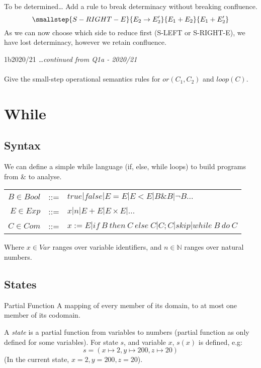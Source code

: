 \begin{examplebox}{To be determined\dots}
    Add a rule to break determinacy without breaking confluence.
    \tcblower
    \[\smallstep{S-RIGHT-E}{E_2 \to E_2'}{E_1 + E_2}{E_1 + E_2'}\]
    As we can now choose which side to reduce first (S-LEFT or S-RIGHT-E), we have lost determinacy, however we retain confluence.
\end{examplebox}

\begin{exambox}{1b}{2020/21}
	\textit{\dots continued from Q1a - 2020/21}
	\\
	\\ Give the small-step operational semantics rules for $or(C_1, C_2)$ and $loop(C)$.
\end{exambox}

\section{While}
\subsection{Syntax}
We can define a simple while language (if, else, while loops) to build programs from \& to analyse.
\begin{center}
	\begin{tabular}{r c l}
		$B \in Bool$ & ::= & $true | false | E = E | E < E | B \& B | \neg B \dots$                   \\
		$E \in Exp$  & ::= & $x | n | E + E | E \times E | \dots$                                     \\
		$C \in Com$  & ::= & $x :=E | if \ B \ then \ C \ else \ C | C;C | skip | while \ B \ do \ C$ \\
	\end{tabular}
\end{center}
Where $x \in Var$ ranges over variable identifiers, and $n \in \mathbb{N}$ ranges over natural numbers.

\subsection{States}
\begin{definitionbox}{Partial Function}
	A mapping of every member of its domain, to at most one member of its codomain.
\end{definitionbox}

A \textit{state} is a partial function from variables to numbers (partial function as only defined for some variables). For state $s$, and variable $x$, $s(x)$ is defined, e.g:
\[s = (x \mapsto 2, y \mapsto 200, z \mapsto 20)\]
(In the current state, $x = 2, y = 200, z = 20$).

